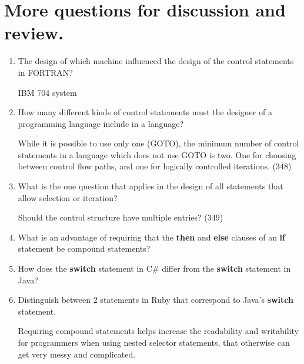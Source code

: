 \section{More questions for discussion and review.}

\begin{enumerate}
  \item The design of which machine influenced the design
    of the control statements in FORTRAN?
    
 \begin{answer}
    IBM 704 system 
     \end{answer}

  \item How many different kinds of control statements
    must the designer of a programming language include
    in a language?


 \begin{answer}
    While it is possible to use only one (GOTO), the minimum number of
    control statements in a language which does not use GOTO is
    two. One for choosing between control flow paths, and one for
    logically controlled iterations. (348)
 \end{answer}
 
  \item What is the one question that applies in the
    design of all statements that allow selection or
    iteration?

 \begin{answer}
    Should the control structure have multiple entries? (349)
 \end{answer}
 
  \item What is an advantage of requiring that
    the \textbf{then} and \textbf{else} clauses of
    an \textbf{if} statement be compound statements?

  \item How does the \textbf{switch} statement in C\#
    differ from the \textbf{switch} statement in Java?

  \item Distinguish between 2 statements in Ruby
    that correspond to Java's \textbf{switch} statement.

 \begin{answer}
    Requiring compound statements helps increase the readability and
    writability for programmers when using nested selector statements,
    that otherwise can get very messy and complicated.
 \end{answer}
 

\end{enumerate}
